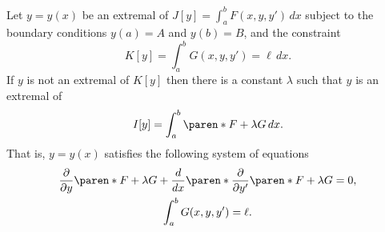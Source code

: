 \documentclass[11pt]{penrose}
\begin{document}
\begin{nthm}\label{thm:constraint-iso-simple}
    Let $y = y(x)$ be an extremal of $J[y] = \int_a^b F(x, y, y') \,dx$ subject to the boundary conditions $y(a) = A$ and $y(b) = B$, and the constraint
    \begin{equation}
        K[y] = \int_a^b G(x,y,y') = \ell \,dx.
    \end{equation}
    If $y$ is not an extremal of $K[y]$ then there is a constant $\lambda$ such that $y$ is an extremal of
    \begin{equation}
        I[y] = \int_a^b \paren*{F + \lambda G} \,dx.
    \end{equation}
    That is, $y = y(x)$ satisfies the following system of equations
    \begin{gather}
            \frac{\pd}{\pd y} \paren*{F + \lambda G} + \frac{d}{dx} \paren*{ \frac{\pd}{\pd y'} \paren*{F + \lambda G} } = 0,\\
            \int_a^b G(x,y,y') = \ell.
    \end{gather}
\end{nthm}
\end{document}
